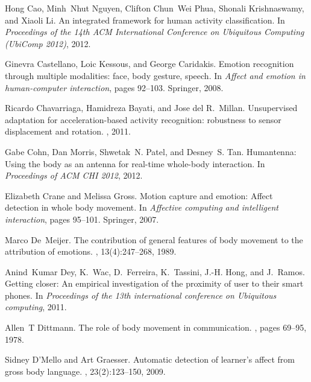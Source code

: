 \documentclass[12pt]{article}
\begin{document}
\begin{thebibliography}{10}
Hong Cao, Minh~Nhut Nguyen, Clifton Chun~Wei Phua, Shonali Krishnaswamy, and
  Xiaoli Li.
\newblock An integrated framework for human activity classification.
\newblock In {\em Proceedings of the 14th ACM International Conference on
  Ubiquitous Computing (UbiComp 2012)}, 2012.

Ginevra Castellano, Loic Kessous, and George Caridakis.
\newblock Emotion recognition through multiple modalities: face, body gesture,
  speech.
\newblock In {\em Affect and emotion in human-computer interaction}, pages
  92--103. Springer, 2008.

Ricardo Chavarriaga, Hamidreza Bayati, and Jose del R.~Millan.
\newblock Unsupervised adaptation for acceleration-based activity recognition:
  robustness to sensor displacement and rotation.
, 2011.

Gabe Cohn, Dan Morris, Shwetak~N. Patel, and Desney~S. Tan.
\newblock Humantenna: Using the body as an antenna for real-time whole-body
  interaction.
\newblock In {\em Proceedings of ACM CHI 2012}, 2012.

Elizabeth Crane and Melissa Gross.
\newblock Motion capture and emotion: Affect detection in whole body movement.
\newblock In {\em Affective computing and intelligent interaction}, pages
  95--101. Springer, 2007.

Marco De~Meijer.
\newblock The contribution of general features of body movement to the
  attribution of emotions.
, 13(4):247--268, 1989.

Anind~Kumar Dey, K.~Wac, D.~Ferreira, K.~Tassini, J.-H. Hong, and J.~Ramos.
\newblock Getting closer: An empirical investigation of the proximity of user
  to their smart phones.
\newblock In {\em Proceedings of the 13th international conference on
  Ubiquitous computing}, 2011.

Allen~T Dittmann.
\newblock The role of body movement in communication.
, pages 69--95, 1978.

Sidney D'Mello and Art Graesser.
\newblock Automatic detection of learner's affect from gross body language.
, 23(2):123--150, 2009.


\end{thebibliography}
\end{document}
